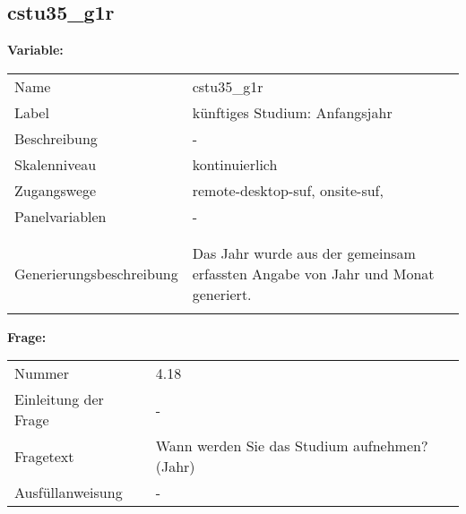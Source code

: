 	
	
	\subsection{cstu35\_g1r}
	\label{subSection:cstu35_g1r}

	\noindent\textbf{Variable:}\\
		\begin{tabular}{lL{11.3cm}}
			\label{tableVariable:cstu35_g1r}
			Name & cstu35\_g1r \\
			Label & künftiges Studium: Anfangsjahr \\
			Beschreibung & - \\
			Skalenniveau & kontinuierlich \\
			Zugangswege &
				remote-desktop-suf,
				onsite-suf,
 \\
			Panelvariablen & -
			 \\
			 \\
 \\
					Generierungsbeschreibung & Das Jahr wurde aus der gemeinsam erfassten Angabe von Jahr und Monat generiert. 
				 \\	
			 \\
		\end{tabular}

		\vspace*{1 cm}
		\noindent\textbf{Frage:}\\
		\begin{tabular}{lL{11.3cm}}
			\label{tableQuestion:cstu35_g1r}
			Nummer & 4.18 \\
			Einleitung der Frage & - \\
			Fragetext & Wann werden Sie das Studium aufnehmen?
(Jahr) \\
			Ausfüllanweisung & - \\
		\end{tabular}




